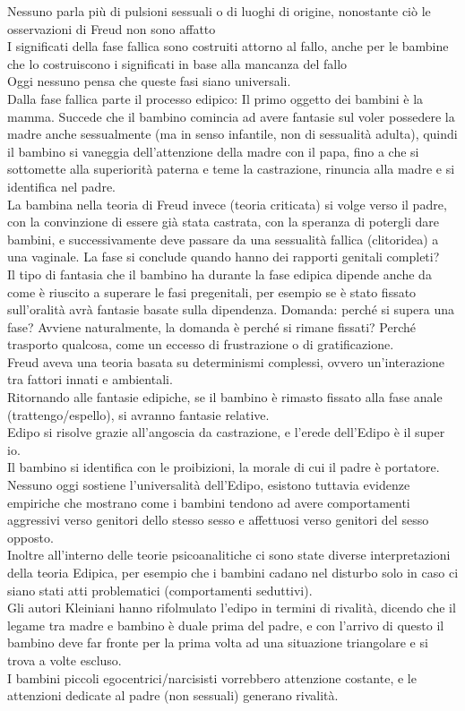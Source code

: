 \documentclass[
]{article}
\begin{document}
Nessuno parla più di pulsioni sessuali o di luoghi di origine,
nonostante ciò le osservazioni di Freud non sono affatto\\
I significati della fase fallica sono costruiti attorno al fallo, anche
per le bambine che lo costruiscono i significati in base alla mancanza
del fallo\\
Oggi nessuno pensa che queste fasi siano universali.\\
Dalla fase fallica parte il processo edipico: Il primo oggetto dei
bambini è la mamma. Succede che il bambino comincia ad avere fantasie
sul voler possedere la madre anche sessualmente (ma in senso infantile,
non di sessualità adulta), quindi il bambino si vaneggia dell'attenzione
della madre con il papa, fino a che si sottomette alla superiorità
paterna e teme la castrazione, rinuncia alla madre e si identifica nel
padre.\\
La bambina nella teoria di Freud invece (teoria criticata) si volge
verso il padre, con la convinzione di essere già stata castrata, con la
speranza di potergli dare bambini, e successivamente deve passare da una
sessualità fallica (clitoridea) a una vaginale. La fase si conclude
quando hanno dei rapporti genitali completi?\\
Il tipo di fantasia che il bambino ha durante la fase edipica dipende
anche da come è riuscito a superare le fasi pregenitali, per esempio se
è stato fissato sull'oralità avrà fantasie basate sulla dipendenza.
Domanda: perché si supera una fase? Avviene naturalmente, la domanda è
perché si rimane fissati? Perché trasporto qualcosa, come un eccesso di
frustrazione o di gratificazione.\\
Freud aveva una teoria basata su determinismi complessi, ovvero
un'interazione tra fattori innati e ambientali.\\
Ritornando alle fantasie edipiche, se il bambino è rimasto fissato alla
fase anale (trattengo/espello), si avranno fantasie relative.\\
Edipo si risolve grazie all'angoscia da castrazione, e l'erede
dell'Edipo è il super io.\\
Il bambino si identifica con le proibizioni, la morale di cui il padre è
portatore.\\
Nessuno oggi sostiene l'universalità dell'Edipo, esistono tuttavia
evidenze empiriche che mostrano come i bambini tendono ad avere
comportamenti aggressivi verso genitori dello stesso sesso e affettuosi
verso genitori del sesso opposto.\\
Inoltre all'interno delle teorie psicoanalitiche ci sono state diverse
interpretazioni della teoria Edipica, per esempio che i bambini cadano
nel disturbo solo in caso ci siano stati atti problematici
(comportamenti seduttivi).\\
Gli autori Kleiniani hanno rifolmulato l'edipo in termini di rivalità,
dicendo che il legame tra madre e bambino è duale prima del padre, e con
l'arrivo di questo il bambino deve far fronte per la prima volta ad una
situazione triangolare e si trova a volte escluso.\\
I bambini piccoli egocentrici/narcisisti vorrebbero attenzione costante,
e le attenzioni dedicate al padre (non sessuali) generano rivalità.
\end{document}
